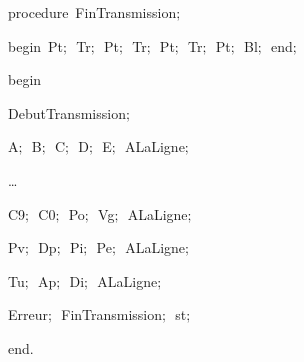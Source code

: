 {\pagebreak[3] 
\vspace{\neglskip}\mbox{\blc  \blk\idt  \mcl procedure\idt \ FinTransmission$;$}\par 
\vspace{\neglskip}\mbox{\blc  \blk\idt  \mcl begin\idt \ Pt$;$\ Tr$;$\ Pt$;$\ Tr$;$\ Pt$;$\ Tr$;$\ Pt$;$\ Bl$;$\ \mcl end\idt $;$}\par 
\medskip

\vspace{\neglskip}\mbox{\blc  \idt  \mcl begin\idt }\par 
\vspace{\neglskip}\mbox{\blc  \blk\idt  DebutTransmission$;$}\par 
\vspace{\neglskip}\mbox{\blc  \blk\idt  A$;$\ B$;$\ C$;$\ D$;$\ E$;$\ ALaLigne$;$}\par 
\vspace{\neglskip}\mbox{\blc  \blk\idt  \ldots}\par 
\vspace{\neglskip}\mbox{\blc  \blk\idt  C9$;$\ C0$;$\ Po$;$\ Vg$;$\ ALaLigne$;$}\par 
\vspace{\neglskip}\mbox{\blc  \blk\idt  Pv$;$\ Dp$;$\ Pi$;$\ Pe$;$\ ALaLigne$;$}\par 
\vspace{\neglskip}\mbox{\blc  \blk\idt  Tu$;$\ Ap$;$\ Di$;$\ ALaLigne$;$\ }\par 
\vspace{\neglskip}\mbox{\blc  \blk\idt  Erreur$;$\ FinTransmission$;$\ st$;$}\par 
\vspace{\neglskip}\mbox{\blc  \idt  \mcl end\idt $.$}\par 
\medskip


\medskip }

